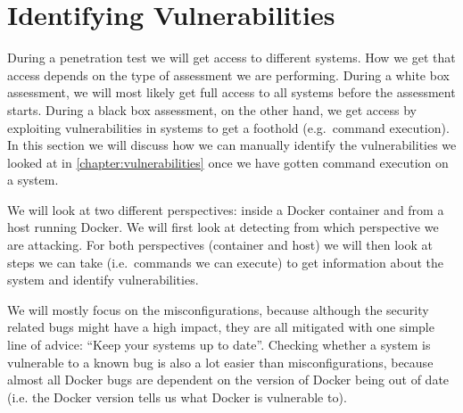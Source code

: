 \section{Identifying Vulnerabilities}
During a penetration test we will get access to different systems. How we get that access depends on the type of assessment we are performing. During a white box assessment, we will most likely get full access to all systems before the assessment starts. During a black box assessment, on the other hand, we get access by exploiting vulnerabilities in systems to get a foothold (e.g.\ command execution). In this section we will discuss how we can manually identify the vulnerabilities we looked at in \autoref{chapter:vulnerabilities} once we have gotten command execution on a system.

We will look at two different perspectives: inside a Docker container and from a host running Docker. We will first look at detecting from which perspective we are attacking. For both perspectives (container and host) we will then look at steps we can take (i.e.\ commands we can execute) to get information about the system and identify vulnerabilities.

\medskip

We will mostly focus on the misconfigurations, because although the security related bugs might have a high impact, they are all mitigated with one simple line of advice: ``Keep your systems up to date''. Checking whether a system is vulnerable to a known bug is also a lot easier than misconfigurations, because almost all Docker bugs are dependent on the version of Docker being out of date (i.e. the Docker version tells us what Docker is vulnerable to).





